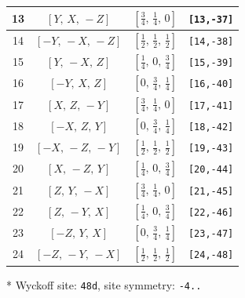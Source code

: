 \documentclass[fleqn,8pt]{jsarticle}
\begin{document}
\begin{longtable}{cccc}
13 & $\left[ Y,\, X,\, - Z \right]$ & $\left[ \frac{3}{4},\, \frac{1}{4},\, 0 \right]$ & {\tt [13,-37]} \\ \hline
14 & $\left[ - Y,\, - X,\, - Z \right]$ & $\left[ \frac{1}{2},\, \frac{1}{2},\, \frac{1}{2} \right]$ & {\tt [14,-38]} \\ \hline
15 & $\left[ Y,\, - X,\, Z \right]$ & $\left[ \frac{1}{4},\, 0,\, \frac{3}{4} \right]$ & {\tt [15,-39]} \\ \hline
16 & $\left[ - Y,\, X,\, Z \right]$ & $\left[ 0,\, \frac{3}{4},\, \frac{1}{4} \right]$ & {\tt [16,-40]} \\ \hline
17 & $\left[ X,\, Z,\, - Y \right]$ & $\left[ \frac{3}{4},\, \frac{1}{4},\, 0 \right]$ & {\tt [17,-41]} \\ \hline
18 & $\left[ - X,\, Z,\, Y \right]$ & $\left[ 0,\, \frac{3}{4},\, \frac{1}{4} \right]$ & {\tt [18,-42]} \\ \hline
19 & $\left[ - X,\, - Z,\, - Y \right]$ & $\left[ \frac{1}{2},\, \frac{1}{2},\, \frac{1}{2} \right]$ & {\tt [19,-43]} \\ \hline
20 & $\left[ X,\, - Z,\, Y \right]$ & $\left[ \frac{1}{4},\, 0,\, \frac{3}{4} \right]$ & {\tt [20,-44]} \\ \hline
21 & $\left[ Z,\, Y,\, - X \right]$ & $\left[ \frac{3}{4},\, \frac{1}{4},\, 0 \right]$ & {\tt [21,-45]} \\ \hline
22 & $\left[ Z,\, - Y,\, X \right]$ & $\left[ \frac{1}{4},\, 0,\, \frac{3}{4} \right]$ & {\tt [22,-46]} \\ \hline
23 & $\left[ - Z,\, Y,\, X \right]$ & $\left[ 0,\, \frac{3}{4},\, \frac{1}{4} \right]$ & {\tt [23,-47]} \\ \hline
24 & $\left[ - Z,\, - Y,\, - X \right]$ & $\left[ \frac{1}{2},\, \frac{1}{2},\, \frac{1}{2} \right]$ & {\tt [24,-48]} \\
\end{longtable}
* Wyckoff site: {\tt 48d}, site symmetry: {\tt -4..}
\renewcommand{\arraystretch}{1.2}
\end{document}
